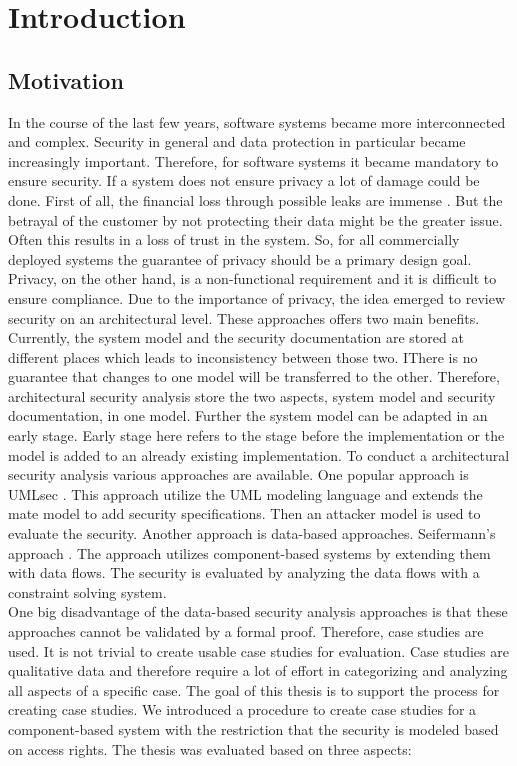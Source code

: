 
\chapter{Introduction}
\label{ch:Introduction}
\section{Motivation}
In the course of the last few years, software systems became more interconnected and complex. Security in general and data protection in particular became increasingly important. Therefore, for software systems it became mandatory to ensure security. If a system does not ensure privacy a lot of damage could be done.  First of all, the financial loss through possible leaks are immense \cite{privHarm}. But the betrayal of the customer by not protecting their data might be the greater issue. Often this results in a loss of trust in the system. So, for all commercially deployed systems the guarantee of privacy should be a primary design goal. Privacy, on the other hand, is a non-functional requirement and it is difficult to ensure compliance. Due to the importance of privacy, the idea emerged to review security on an architectural level. These approaches offers two main benefits. Currently, the system model and the security documentation are stored at different places which leads to inconsistency between those two. IThere is no guarantee that changes to one model will be transferred to the other. Therefore, architectural security analysis store the two aspects, system model and security documentation, in one model. Further the system model can be adapted in an early stage. Early stage here refers to the stage before the implementation or the model is added to an already existing implementation. To conduct a architectural security analysis various approaches are available. One popular approach is UMLsec \cite{UMLSec}. This approach utilize the UML modeling language and extends the mate model to add security specifications. Then an attacker model is used to evaluate the security. Another approach is data-based approaches. Seifermann's approach \cite{Seifermann16}. The approach utilizes component-based systems by extending them with data flows. The security is evaluated by analyzing the data flows with a constraint solving system.\\ One big disadvantage of the data-based security analysis approaches is that these approaches cannot be validated by a formal proof. Therefore, case studies are used. It is not trivial to create usable case studies for evaluation. Case studies are qualitative data and therefore require a lot of effort in categorizing and analyzing all aspects of a specific case. The goal of this thesis is to support the process for creating case studies. We introduced a procedure to create case studies for a component-based system with the restriction that the security is modeled based on access rights. The thesis was evaluated based on three aspects:
